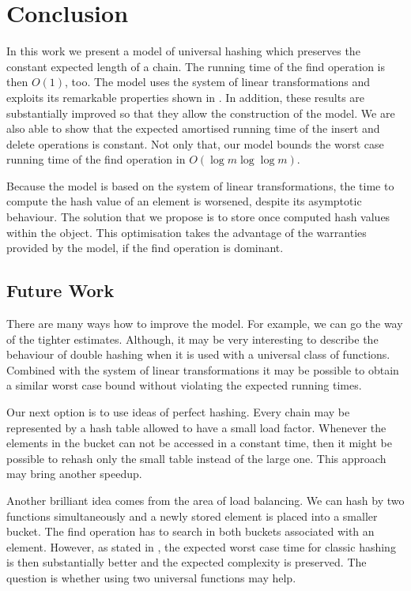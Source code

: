 \chapter{Conclusion}
In this work we present a model of universal hashing which preserves the constant expected length of a chain. The running time of the find operation is then $O(1)$, too. The model uses the system of linear transformations and exploits its remarkable properties shown in \cite{DBLP:journals/jacm/AlonDMPT99}. In addition, these results are substantially improved so that they allow the construction of the model. We are also able to show that the expected amortised running time of the insert and delete operations is constant. Not only that, our model bounds the worst case running time of the find operation in $O(\log m \log \log m)$. 

Because the model is based on the system of linear transformations, the time to compute the hash value of an element is worsened, despite its asymptotic behaviour. The solution that we propose is to store once computed hash values within the object. This optimisation takes the advantage of the warranties provided by the model, if the find operation is dominant. 

\section{Future Work}
There are many ways how to improve the model. For example, we can go the way of the tighter estimates. Although, it may be very interesting to describe the behaviour of double hashing when it is used with a universal class of functions. Combined with the system of linear transformations it may be possible to obtain a similar worst case bound without violating the expected running times. 

Our next option is to use ideas of perfect hashing. Every chain may be represented by a hash table allowed to have a small load factor. Whenever the elements in the bucket can not be accessed in a constant time, then it might be possible to rehash only the small table instead of the large one. This approach may bring another speedup.

Another brilliant idea comes from the area of load balancing. We can hash by two functions simultaneously and a newly stored element is placed into a smaller bucket. The find operation has to search in both buckets associated with an element. However, as stated in \cite{1076315}, the expected worst case time for classic hashing is then substantially better and the expected complexity is preserved. The question is whether using two universal functions may help.

